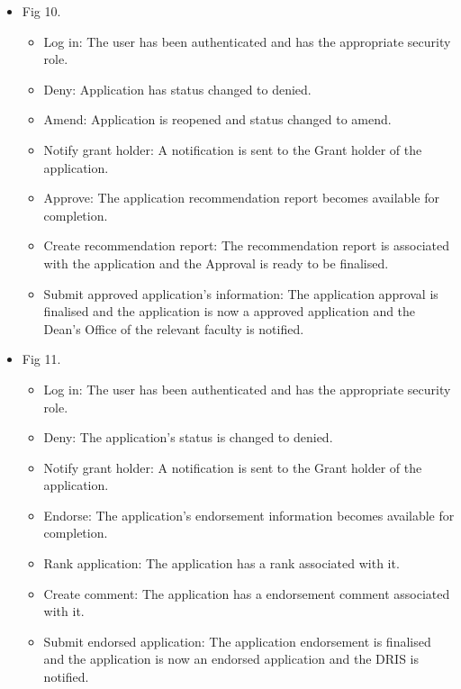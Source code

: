 \documentclass[12pt]{article}
\begin{document}
\begin{itemize}
	\item Fig 10.
		\begin{itemize}
			\item Log in: The user has been authenticated and has the appropriate security role.
			\item Deny: Application has status changed to denied.
			\item Amend: Application is reopened and status changed to amend.
			\item Notify grant holder: A notification is sent to the Grant holder of the application.  
			\item Approve:  The application recommendation report becomes available for completion.
			\item Create recommendation report: The recommendation report is associated with the application and the Approval is ready to be finalised.				
			\item Submit approved application's information: The application approval is finalised and the application is now a approved application and the Dean's Office of the relevant faculty is notified.									
		\end{itemize}
		
	\item Fig 11.
		\begin{itemize}
			\item Log in: The user has been authenticated and has the appropriate security role.
			\item Deny: The application's status is changed to denied. 
			\item Notify grant holder: A notification is sent to the Grant holder of the application.
			\item Endorse: The application's endorsement information becomes available for completion.
			\item Rank application: The application has a rank associated with it.	
			\item Create comment: The application has a endorsement comment associated with it.			
			\item Submit endorsed application: The application endorsement is finalised and the application is now an endorsed application and the DRIS is notified.									
		\end{itemize}
	

\end{itemize}
\end{document}
